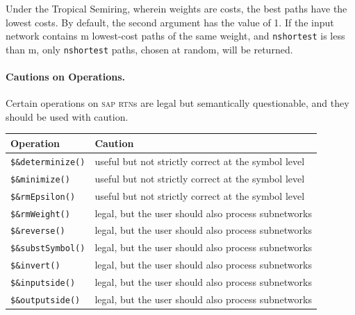 \documentclass[letterpaper,12pt]{article}
\newcommand{\acro}{\textsc}
\begin{document}
\begin{samepage}
\begin{changebar}

Under the Tropical Semiring, wherein weights are costs, the best paths
have the lowest costs.  By default, the second argument has the value of
1.  If the input network contains m lowest-cost paths of the same weight,
and \texttt{nshortest} is less than m, only \texttt{nshortest} paths,
chosen at random, will be returned.  

\end{changebar}
\end{samepage}

\paragraph{Cautions on Operations.}

Certain operations on \acro{sap} \acro{rtn}s are legal but semantically 
questionable, and
they should be used with caution.

\vspace{.5cm}

\noindent
\begin{tabular}{|l|p{9cm}|}
\hline
\textbf{Operation} & \textbf{Caution} \\
\hline
\hline
\verb!$&determinize()! & useful but not strictly correct at the symbol level \\
\hline
\verb!$&minimize()! & useful but not strictly correct at the symbol level \\
\hline
\verb!$&rmEpsilon()! & useful but not strictly correct at the symbol level \\
\hline
\hline
\verb!$&rmWeight()! & legal, but the user should also process subnetworks \\
\hline
\verb!$&reverse()! & legal, but the user should also process subnetworks \\
\hline
\verb!$&substSymbol()! & legal, but the user should also process subnetworks \\
\hline
\verb!$&invert()! & legal, but the user should also process subnetworks \\
\hline
\verb!$&inputside()! & legal, but the user should also process subnetworks \\
\hline
\verb!$&outputside()! & legal, but the user should also process subnetworks \\
\hline
\end{tabular}

\vspace{.5cm}
\end{document}
